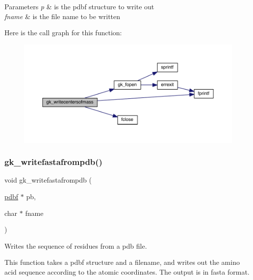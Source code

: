 \begin{DoxyParams}{Parameters}
{\em p} & is the pdbf structure to write out \\
\hline
{\em fname} & is the file name to be written \\
\hline
\end{DoxyParams}
Here is the call graph for this function\+:\nopagebreak
\begin{figure}[H]
\begin{center}
\leavevmode
\includegraphics[width=350pt]{a00125_a6be4d6cf94a1dace5677865e8958b7b3_cgraph}
\end{center}
\end{figure}
\mbox{\label{a00125_a39b1b4f30c03454894d5218edd8296e0}} 
\subsubsection{\texorpdfstring{gk\+\_\+writefastafrompdb()}{gk\_writefastafrompdb()}}
{\footnotesize\ttfamily void gk\+\_\+writefastafrompdb (\begin{DoxyParamCaption}\item[{\hyperlink{a00666}{pdbf} $\ast$}]{pb,  }\item[{char $\ast$}]{fname }\end{DoxyParamCaption})}



Writes the sequence of residues from a pdb file. 

This function takes a pdbf structure and a filename, and writes out the amino acid sequence according to the atomic coordinates. The output is in fasta format.


